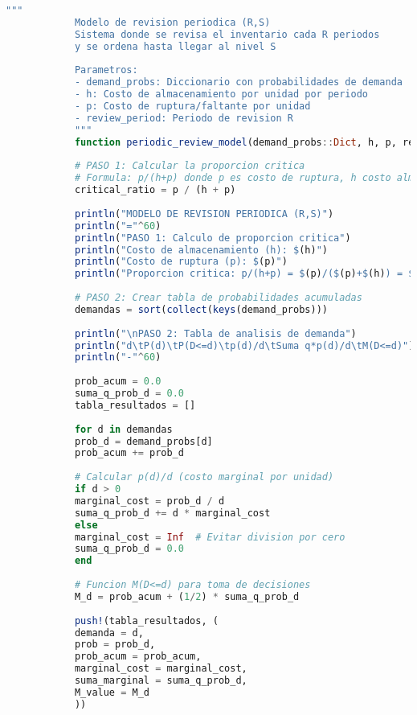 \documentclass[12pt,a4paper]{book}
\begin{document}
	\begin{tcolorbox}[enhanced,colback=violetaclaro,colframe=moradoacento,boxrule=3pt,arc=12pt,
		drop shadow,title={\Large\bfseries\color{white} \faCalendar\ MODELO (R,S) DE REVISION PERIODICA},breakable]
		
		\begin{lstlisting}[language=Julia,basicstyle=\footnotesize\ttfamily]
			"""
			Modelo de revision periodica (R,S)
			Sistema donde se revisa el inventario cada R periodos
			y se ordena hasta llegar al nivel S
			
			Parametros:
			- demand_probs: Diccionario con probabilidades de demanda
			- h: Costo de almacenamiento por unidad por periodo
			- p: Costo de ruptura/faltante por unidad
			- review_period: Periodo de revision R
			"""
			function periodic_review_model(demand_probs::Dict, h, p, review_period=1)
			
			# PASO 1: Calcular la proporcion critica
			# Formula: p/(h+p) donde p es costo de ruptura, h costo almacenamiento
			critical_ratio = p / (h + p)
			
			println("MODELO DE REVISION PERIODICA (R,S)")
			println("="^60)
			println("PASO 1: Calculo de proporcion critica")
			println("Costo de almacenamiento (h): $(h)")
			println("Costo de ruptura (p): $(p)")
			println("Proporcion critica: p/(h+p) = $(p)/($(p)+$(h)) = $(critical_ratio)")
			
			# PASO 2: Crear tabla de probabilidades acumuladas
			demandas = sort(collect(keys(demand_probs)))
			
			println("\nPASO 2: Tabla de analisis de demanda")
			println("d\tP(d)\tP(D<=d)\tp(d)/d\tSuma q*p(d)/d\tM(D<=d)")
			println("-"^60)
			
			prob_acum = 0.0
			suma_q_prob_d = 0.0
			tabla_resultados = []
			
			for d in demandas
			prob_d = demand_probs[d]
			prob_acum += prob_d
			
			# Calcular p(d)/d (costo marginal por unidad)
			if d > 0
			marginal_cost = prob_d / d
			suma_q_prob_d += d * marginal_cost
			else
			marginal_cost = Inf  # Evitar division por cero
			suma_q_prob_d = 0.0
			end
			
			# Funcion M(D<=d) para toma de decisiones
			M_d = prob_acum + (1/2) * suma_q_prob_d
			
			push!(tabla_resultados, (
			demanda = d,
			prob = prob_d,
			prob_acum = prob_acum,
			marginal_cost = marginal_cost,
			suma_marginal = suma_q_prob_d,
			M_value = M_d
			))
			

\end{lstlisting}
\end{tcolorbox}
\end{document}
